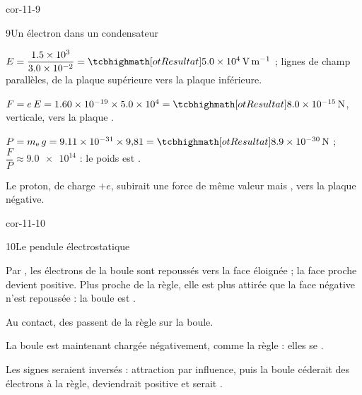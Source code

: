 \begin{blocLivre}{cor-11-9}
\begin{corrige}{9}{Un électron dans un condensateur}
\begin{questions}
\item $E=\dfrac{\num{1,5e3}}{\num{3,0e-2}}=\res{\qty{5,0e4}{V.m^{-1}}}$ ; lignes de champ parallèles, de la plaque supérieure vers la plaque inférieure.
\item $F=e\,E=\num{1,60e-19}\times\num{5,0e4}=\res{\qty{8,0e-15}{N}}$, verticale, vers la plaque .
\item $P=m_\mathrm{e}\,g=\num{9,11e-31}\times9{,}81=\res{\qty{8,9e-30}{N}}$ ; $\dfrac{F}{P}\approx\num{9,0e14}$ : le poids est .
\item Le proton, de charge $+e$, subirait une force de même valeur mais , vers la plaque négative.
\end{questions}
\end{corrige}
\end{blocLivre}
\begin{blocLivre}{cor-11-10}
\begin{corrige}{10}{Le pendule électrostatique}
\begin{questions}
\item Par , les électrons de la boule sont repoussés vers la face éloignée ; la face proche devient positive. Plus
proche de la règle, elle est plus attirée que la face négative n'est repoussée : la boule est .
\item Au contact, des  passent de la règle sur la boule.
\item La boule est maintenant chargée négativement, comme la règle : elles se .
\item Les signes seraient inversés : attraction par influence, puis la boule céderait des électrons à la règle, deviendrait
positive et serait .
\end{questions}
\end{corrige}
\end{blocLivre}
